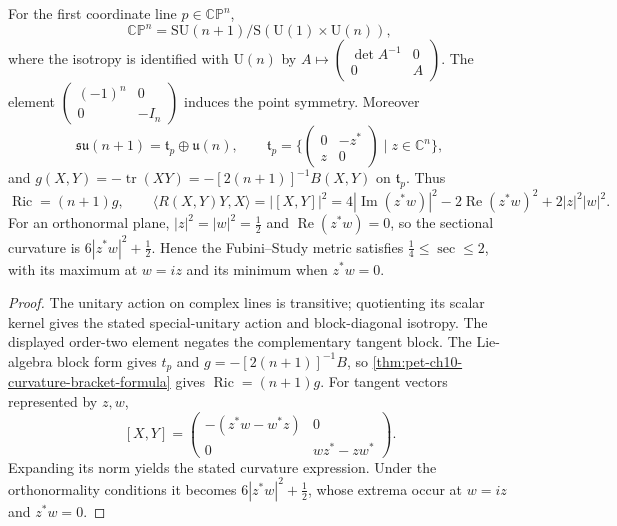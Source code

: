 \begin{example}
  \label{ex:pet-ch10-complex-projective-space}

  For the first coordinate line $p\in\mathbb{CP}^n$,
  \[
    \mathbb{CP}^n
      =\mathrm{SU}(n+1)/\mathrm S(\mathrm U(1)\times\mathrm U(n)),
  \]
  where the isotropy is identified with $\mathrm U(n)$ by
  $A\mapsto\left(\begin{smallmatrix}\det A^{-1}&0\\0&A\end{smallmatrix}\right)$.
  The element
  $\left(\begin{smallmatrix}(-1)^n&0\\0&-I_n\end{smallmatrix}\right)$ induces
  the point symmetry. Moreover
  \[
    \mathfrak{su}(n+1)=\mathfrak t_p\oplus\mathfrak u(n),\qquad
    \mathfrak t_p=\Big\{\begin{pmatrix}0&-z^*\\z&0\end{pmatrix}\mid z\in\mathbb C^n\Big\},
  \]
  and $g(X,Y)=-\operatorname{tr}(XY)=-[2(n+1)]^{-1}B(X,Y)$ on $\mathfrak t_p$.
  Thus
  \[
    \operatorname{Ric}=(n+1)g,\qquad
    \langle R(X,Y)Y,X\rangle=|[X,Y]|^2=4|\operatorname{Im}(z^*w)|^2-2\operatorname{Re}(z^*w)^2+2|z|^2|w|^2.
  \]
  For an orthonormal plane, $|z|^2=|w|^2=\tfrac12$ and
  $\operatorname{Re}(z^*w)=0$, so the sectional curvature is
  $6|z^*w|^2+\tfrac12$. Hence the Fubini--Study metric satisfies
  $\tfrac14\le\sec\le2$, with its maximum at $w=iz$ and its minimum when
  $z^*w=0$.
\end{example}
\begin{proof}
  \sketch
  The unitary action on complex lines is transitive; quotienting its scalar
  kernel gives the stated special-unitary action and block-diagonal isotropy.
  The displayed order-two element negates the complementary tangent block.
  The Lie-algebra block form gives $t_p$ and
  $g=-[2(n+1)]^{-1}B$, so
  \cref{thm:pet-ch10-curvature-bracket-formula} gives
  $\operatorname{Ric}=(n+1)g$. For tangent vectors represented by $z,w$,
  \[
    [X,Y]=\begin{pmatrix}-(z^*w-w^*z)&0\\0&wz^*-zw^*\end{pmatrix}.
  \]
  Expanding its norm yields the stated curvature expression. Under the
  orthonormality conditions it becomes $6|z^*w|^2+\tfrac12$, whose extrema
  occur at $w=iz$ and $z^*w=0$.
\end{proof}

